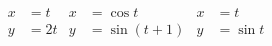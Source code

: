 \begin{align*}
x &= t  & x &= \cos t    & x &= t \\
y &= 2t & y &= \sin(t+1) & y &= \sin t
\end{align*}
